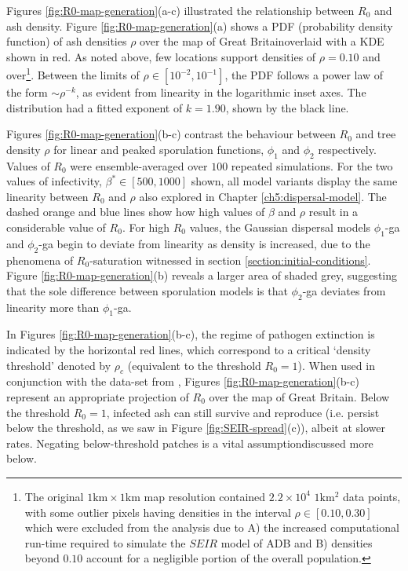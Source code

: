 Figures \ref{fig:R0-map-generation}(a-c) illustrated the relationship between $R_0$ and ash density.
Figure \ref{fig:R0-map-generation}(a) shows a PDF (probability density function) of ash densities $\rho$ over the map of Great Britain\textemdash overlaid with a KDE shown in red.
As noted above, few locations support densities of $\rho=0.10$ and over\footnote{
The original $\mathrm{1km \times 1km}$ map resolution contained $2.2\times 10^4$ $1\mathrm{km^2}$ data points, 
with some outlier pixels having densities in the interval $\rho \in [0.10, 0.30]$ which were excluded from the analysis due to 
A) the increased computational run-time required to simulate the $SEIR$ model of ADB  
and B) densities beyond $0.10$ account for a negligible portion of the overall population.}. 
Between the limits of $\rho \in [10^{-2}, 10^{-1}]$, the PDF follows a power law of the form $\sim \rho ^{-k}$, as evident from linearity in the logarithmic inset axes.
The distribution had a fitted exponent of $k=1.90$, shown by the black line.

Figures \ref{fig:R0-map-generation}(b-c) contrast the behaviour between $R_0$ and tree density $\rho$ for linear and peaked sporulation functions, $\phi_1$ and $\phi_2$ respectively.
Values of $R_0$ were ensemble-averaged over $100$ repeated simulations.
For the two values of infectivity, $\beta^*\in [500, 1000]$ shown, all model variants display the same linearity between $R_0$ and $\rho$ \textemdash also explored in Chapter \ref{ch5:dispersal-model}.
The dashed orange and blue lines show how high values of $\beta$ and $\rho$ result in a considerable value of $R_0$.
For high $R_0$ values, the Gaussian dispersal models $\phi_1$-ga and $\phi_2$-ga begin to deviate from linearity as density is increased,
due to the phenomena of $R_0$-saturation witnessed in section \ref{section:initial-conditions}.
Figure \ref{fig:R0-map-generation}(b) reveals a larger area of shaded grey, 
suggesting that the sole difference between sporulation models is that $\phi_2$-ga deviates from linearity more than $\phi_1$-ga.

In Figures \ref{fig:R0-map-generation}(b-c), the regime of pathogen extinction is indicated by the horizontal red lines, 
which correspond to a critical `density threshold' denoted by $\rho_c$ (equivalent to the threshold $R_0 = 1$).
When used in conjunction with the data-set from \cite{hill.data}, Figures \ref{fig:R0-map-generation}(b-c) represent an appropriate projection of $R_0$ over the map of Great Britain.
Below the threshold $R_0=1$, infected ash can still survive and reproduce (i.e. persist below the threshold, as we saw in Figure \ref{fig:SEIR-spread}(c)), albeit at slower rates.
Negating below-threshold patches is a vital assumption\textemdash discussed more below.

